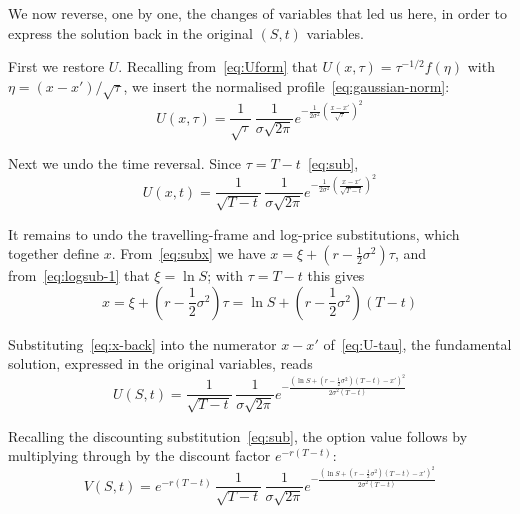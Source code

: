 \documentclass[a4paper,12pt]{article}
\numberwithin{equation}{section}
\begin{document}
We now reverse, one by one, the changes of variables that led us here, in order
to express the solution back in the original $(S,t)$ variables.

First we restore $U$. Recalling from~\eqref{eq:Uform} that
$U(x,\tau) = \tau^{-1/2} f(\eta)$ with $\eta = (x-x')/\sqrt{\tau}$, we insert the
normalised profile~\eqref{eq:gaussian-norm}:
\begin{equation}\label{eq:U-eta}
  U(x,\tau) = \frac{1}{\sqrt{\tau}}\,\frac{1}{\sigma\sqrt{2\pi}}
    e^{-\frac{1}{2\sigma^2}\left(\frac{x-x'}{\sqrt{\tau}}\right)^2}
\end{equation}

Next we undo the time reversal. Since $\tau = T - t$~\eqref{eq:sub},
\begin{equation}\label{eq:U-tau}
  U(x,t) = \frac{1}{\sqrt{T-t}}\,\frac{1}{\sigma\sqrt{2\pi}}
    e^{-\frac{1}{2\sigma^2}\left(\frac{x-x'}{\sqrt{T-t}}\right)^2}
\end{equation}

It remains to undo the travelling-frame and log-price substitutions, which
together define $x$. From~\eqref{eq:subx} we have
$x = \xi + \left(r - \tfrac{1}{2}\sigma^2\right)\tau$, and
from~\eqref{eq:logsub-1} that $\xi = \ln S$; with $\tau = T-t$ this gives
\begin{equation}\label{eq:x-back}
  x = \xi + \left(r - \frac{1}{2}\sigma^2\right)\tau
    = \ln S + \left(r - \frac{1}{2}\sigma^2\right)(T-t)
\end{equation}

Substituting~\eqref{eq:x-back} into the numerator $x - x'$ of~\eqref{eq:U-tau},
the fundamental solution, expressed in the original variables, reads
\begin{equation}\label{eq:U-final}
    U(S,t) = \frac{1}{\sqrt{T-t}}\,\frac{1}{\sigma\sqrt{2\pi}}
      e^{-
        \frac{\left(\ln S + \left(r - \frac{1}{2}\sigma^2\right)(T-t) - x'\right)^2}{2\sigma^2(T-t)}
      }
\end{equation}

Recalling the discounting substitution~\eqref{eq:sub}, the option value follows
by multiplying through by the discount factor $e^{-r(T-t)}$:
\begin{equation}\label{eq:v}
   V(S,t)=e^{-r(T-t)}\,\frac{1}{\sqrt{T-t}}\,\frac{1}{\sigma\sqrt{2\pi}}
      e^{-
        \frac{\left(\ln S + \left(r - \frac{1}{2}\sigma^2\right)(T-t) - x'\right)^2}{2\sigma^2(T-t)}
      }
\end{equation}
\end{document}
